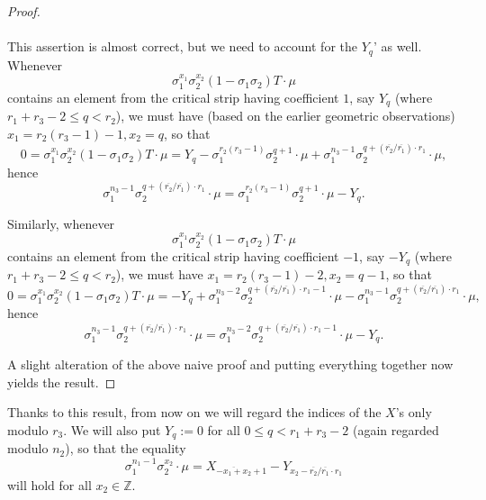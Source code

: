 \documentclass[12pt,a4paper]{article}
\theoremstyle{definition}
\newcommand{\Z}{\mathbb{Z}}
\newcommand{\uo}{\overline{r_2}}
\newcommand{\vo}{\overline{r_1}}
\begin{document}
\begin{proof}
\paragraph*{}
This assertion is almost correct, but we need to account for the $Y_q$' as well. Whenever $$\sigma_1^{x_1}\sigma_2^{x_2}(1-\sigma_1\sigma_2)T\cdot \mu$$ contains an element from the critical strip having coefficient $1$, say $Y_q$ (where $r_1+r_3-2\leq q<r_2$), we must have (based on the earlier geometric observations) $x_1=r_2(r_3-1)-1, x_2=q$, so that 
$$0=\sigma_1^{x_1}\sigma_2^{x_2}(1-\sigma_1\sigma_2)T\cdot \mu=Y_q-\sigma_1^{r_2(r_3-1)}\sigma_2^{q+1}\cdot \mu+\sigma_1^{n_3-1}\sigma_2^{q+(\uo/\vo)\cdot r_1}\cdot \mu,$$
hence $$\sigma_1^{n_3-1}\sigma_2^{q+(\uo/\vo)\cdot r_1}\cdot \mu=\sigma_1^{r_2(r_3-1)}\sigma_2^{q+1}\cdot \mu- Y_q.$$

Similarly, whenever $$\sigma_1^{x_1}\sigma_2^{x_2}(1-\sigma_1\sigma_2)T\cdot \mu$$ contains an element from the critical strip having coefficient $-1$, say $-Y_q$ (where $r_1+r_3-2\leq q<r_2$), we must have $x_1=r_2(r_3-1)-2, x_2=q-1$, so that 
$$0=\sigma_1^{x_1}\sigma_2^{x_2}(1-\sigma_1\sigma_2)T\cdot \mu=-Y_q+\sigma_1^{n_3-2}\sigma_2^{q+(\uo/\vo)\cdot r_1-1}\cdot \mu-\sigma_1^{n_3-1}\sigma_2^{q+(\uo/\vo)\cdot r_1}\cdot \mu,$$
hence $$\sigma_1^{n_3-1}\sigma_2^{q+(\uo/\vo)\cdot r_1}\cdot \mu=\sigma_1^{n_3-2}\sigma_2^{q+(\uo/\vo)\cdot r_1-1}\cdot \mu- Y_q.$$

A slight alteration of the above naive proof and putting everything together now yields the result.
\end{proof}
Thanks to this result, from now on we will regard the indices of the $X$'s only modulo $r_3$. We will also put $Y_q:=0$ for all $0\leq q<r_1+r_3-2$ (again regarded modulo $n_2$), so that the equality $$\sigma_1^{n_1-1}\sigma_2^{x_2}\cdot \mu=X_{\overline{-x_1+x_2}+1}-Y_{x_2-\uo/\vo\cdot r_1} $$ will hold for all $x_2\in\Z$.
\end{document}
